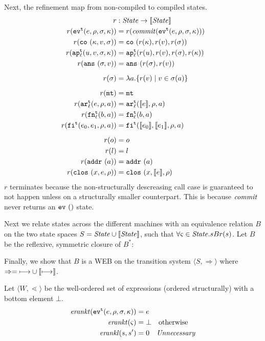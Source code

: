 \documentclass{llncs}
\newcommand{\setof}[1]{\{ #1 \}}
\begin{document}
Next, the refinement map from non-compiled to compiled states.
\begin{align*}
r &: \State \to \CompState \\
r(\ev[^\mcntr]{\mexp,\menv,\msto,\mkont}) &= r(\commit(\ev[^\mcntr]{\mexp,\menv,\msto,\mkont})) \\
r(\co{\mkont, \mval,\msto}) &= \co{r(\mkont), r(\mval), r(\msto)} \\
r(\ap[_\mlab^\mcntr]{\mvalx{u},\mval,\msto,\mkont}) &= \ap[_\mlab^\mcntr]{r(\mvalx{u}),r(\mval),r(\msto),r(\mkont)} \\
r(\ans{\msto,\mval}) &= \ans{r(\msto), r(\mval)} \\[2mm]
r(\msto) &= \lambda \maddr. \setof{r(\mval) \mid \mval \in \msto(\maddr)} \\[2mm]
r(\kmt) &= \kmt \\
r(\kar[^\mcntr_\mlab]{\mexp,\menv,\maddr}) &= \kar[^\mcntr_\mlab]{\compile{\mexp},\menv,\maddr} \\
r(\kfn[^\mcntr_\mlab]{\maddralt,\maddr}) &= \kfn[^\mcntr_\mlab]{\maddralt,\maddr} \\
r(\kif[^\mcntr]{\mexpi0,\mexpi1,\menv,\maddr}) &= \kif[^\mcntr]{\compile{\mexpi0},\compile{\mexpi1},\menv,\maddr} \\[2mm]
r(\mop) &= \mop \\
r(\mlit) &= \mlit \\
r(\saddr{\maddr}) &= \saddr{\maddr} \\
r(\clos{\mvar,\mexp,\menv}) &= \clos{\mvar,\compile{\mexp},\menv}
\end{align*}
$r$ terminates because the non-structurally descreasing call case is
guaranteed to not happen unless on a structurally smaller
counterpart. This is because $\commit$ never returns an $\ev{}$
state.

Next we relate states across the different machines with an
equivalence relation $B$ on the two state spaces $S = \State \cup \CompState$,
such that $\forall \mstate \in \State. s B r(s)$. Let $B$ be the reflexive, symmetric closure of $B^*$:
\begin{mathpar}
\end{mathpar}

Finally, we show that $B$ is a WEB on the transition system
$\langle S, \Rightarrow \rangle$ where $\Rightarrow = \machstep \cup \cmachstep$.

Let $\langle W, \lessdot \rangle$ be the well-ordered set of expressions (ordered structurally) with a bottom element $\bot$.
\begin{align*}
\erankt(\ev[^\mcntr]{\mexp,\menv,\msto,\mkont}) &= \mexp \\
\erankt(\mstate) &= \bot \quad \text{otherwise} \\
\erankl(s,s') &= 0 \quad \text{{\it Unnecessary}}
\end{align*}
\end{document}
